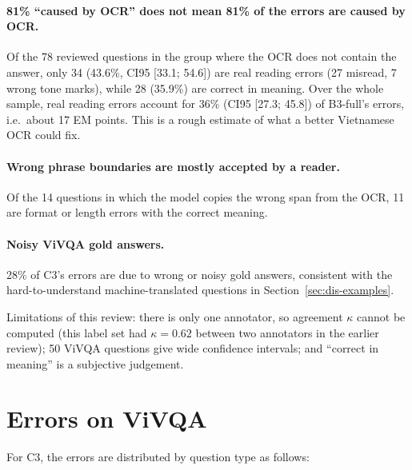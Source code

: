 \paragraph{81\% ``caused by OCR'' does not mean 81\% of the errors are caused by OCR.} Of the
78 reviewed questions in the group where the OCR does not contain the answer, only 34
(43.6\%, CI95 [33.1; 54.6]) are real reading errors (27 misread, 7 wrong tone marks), while
28 (35.9\%) are correct in meaning. Over the whole sample, real reading errors account for
36\% (CI95 [27.3; 45.8]) of B3-full's errors, i.e.\ about 17 EM points. This is a rough
estimate of what a better Vietnamese OCR could fix.

\paragraph{Wrong phrase boundaries are mostly accepted by a reader.} Of the 14 questions in
which the model copies the wrong span from the OCR, 11 are format or length errors with the
correct meaning.

\paragraph{Noisy ViVQA gold answers.} 28\% of C3's errors are due to wrong or noisy gold
answers, consistent with the hard-to-understand machine-translated questions in
Section~\ref{sec:dis-examples}.

Limitations of this review: there is only one annotator, so agreement $\kappa$ cannot be
computed (this label set had $\kappa = 0.62$ between two annotators in the earlier review);
50 ViVQA questions give wide confidence intervals; and ``correct in meaning'' is a subjective
judgement.

\section{Errors on ViVQA}
\label{sec:dis-vivqa}

For C3, the errors are distributed by question type as follows:


